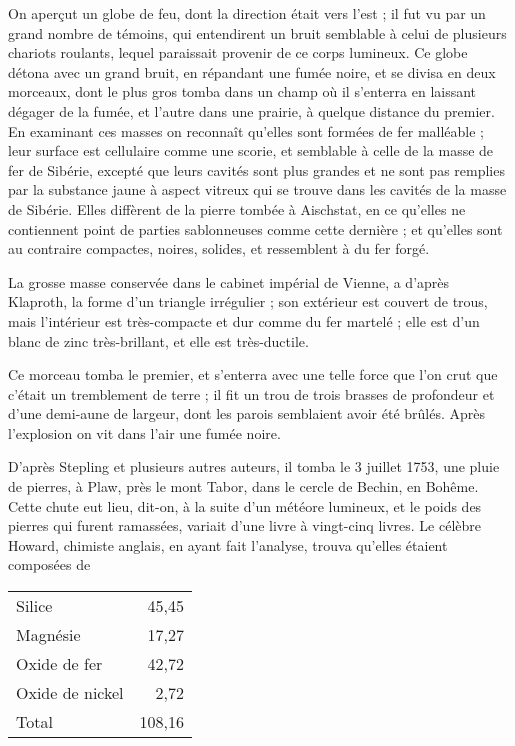 \documentclass[a4paper, 12pt, oneside, french]{article}
\begin{document}
On aperçut un globe de feu, dont la direction était vers l'est ; il fut vu par un grand nombre de témoins, qui entendirent un bruit semblable à celui de plusieurs chariots roulants, lequel paraissait provenir de ce corps lumineux. Ce globe détona avec un grand bruit, en répandant une fumée noire, et se divisa en deux morceaux, dont le plus gros tomba dans un champ où il s'enterra en laissant dégager de la fumée, et l'autre dans une prairie, à quelque distance du premier. En examinant ces masses on reconnaît qu'elles sont formées de fer malléable ; leur surface est cellulaire comme une scorie, et semblable à celle de la masse de fer de Sibérie, excepté que leurs cavités sont plus grandes et ne sont pas remplies par la substance jaune à aspect vitreux qui se trouve dans les cavités de la masse de Sibérie. Elles diffèrent de la pierre tombée à Aischstat, en ce qu'elles ne contiennent point de parties sablonneuses comme cette dernière ; et qu'elles sont au contraire compactes, noires, solides, et ressemblent à du fer forgé.

La grosse masse conservée dans le cabinet impérial de Vienne, a d'après Klaproth, la forme d'un triangle irrégulier ; son extérieur est couvert de trous, mais l'intérieur est très-compacte et dur comme du fer martelé ; elle est d'un blanc de zinc très-brillant, et elle est très-ductile.

Ce morceau tomba le premier, et s'enterra avec une telle force que l'on crut que c'était un tremblement de terre ; il fit un trou de trois brasses de profondeur et d'une demi-aune de largeur, dont les parois semblaient avoir été brûlés. Après l'explosion on vit dans l'air une fumée noire.

D'après Stepling et plusieurs autres auteurs, il tomba le 3 juillet 1753, une pluie de pierres, à Plaw, près le mont Tabor, dans le cercle de Bechin, en Bohême. Cette chute eut lieu, dit-on, à la suite d'un météore lumineux, et le poids des pierres qui furent ramassées, variait d'une livre à vingt-cinq livres. Le célèbre Howard, chimiste anglais, en ayant fait l'analyse, trouva qu'elles étaient composées de
\begin{table}[H]
    \centering
    \begin{tabular}{l r}
        Silice & 45,45 \\
        Magnésie & 17,27 \\
        Oxide de fer & 42,72 \\
        Oxide de nickel & 2,72 \\ \hline
        Total & 108,16 \\
    \end{tabular}
\end{table}
\end{document}
